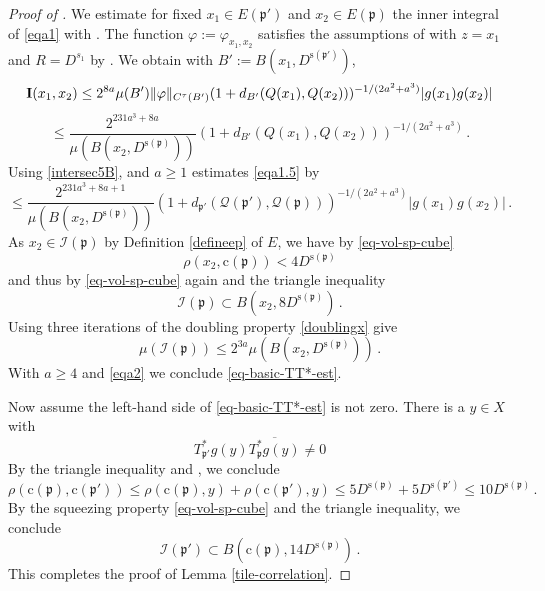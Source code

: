 \documentclass[10pt,a4paper]{article}
\theoremstyle{plain}
\theoremstyle{definition}
\numberwithin{equation}{subsection}
\newcommand{\fp}{{\mathfrak p}}
\newcommand{\pc}{{\mathrm{c}}}
\newcommand{\ps}{{\mathrm{s}}}
\newcommand{\scI}{{\mathcal{I}}} %
\newcommand{\tQ}{{Q}}
\newcommand{\fcc}{{\mathcal{Q}}}
\begin{document}
\begin{proof}[Proof of ]
We estimate for fixed $x_1\in E(\fp')$ and
$x_2\in E(\fp)$ the inner integral of \eqref{eqa1} with
. The function
$\varphi:=\varphi_{x_1,x_2}$ satisfies the assumptions of
 with $z = x_1$ and $R = D^{s_1}$ by .
We obtain with $B':= B(x_1, D^{\ps(\fp')})$,
\begin{equation*}
 {\bf I}(x_1, x_2) \le 2^{8a} \mu(B') \|{\varphi}\|_{C^\tau(B')}
       (1 + d_{B'}(\tQ(x_1),\tQ(x_2)))^{-1/(2a^2+a^3)}|g(x_1)g(x_2)|
\end{equation*}
\begin{equation}
\label{eqa1.5}
 \le \frac{2^{231a^3+8a}}
 {\mu(B(x_2, D^{\ps(\fp)}))}
       (1 + d_{B'}(\tQ(x_1),\tQ(x_2)))^{-1/(2a^2+a^3)}\,.
\end{equation}
Using \eqref{intersec5B},  and $a\ge 1$ estimates \eqref{eqa1.5} by
\begin{equation}\label{eqa2}
 \le \frac{2^{231a^3 + 8a + 1}}
 {\mu(B(x_2, D^{\ps(\fp)}))}
       (1+d_{\fp'}(\fcc(\fp'), \fcc(\fp)))^{-1/(2a^2+a^3)}|g(x_1)g(x_2)|\,.
\end{equation}
As $x_2\in \scI(\fp)$ by Definition \eqref{defineep} of $E$, we have by \eqref{eq-vol-sp-cube}
\begin{equation}
    \rho(x_2,\pc(\fp)) < 4D^{\ps(\fp)}
\end{equation}
and thus by \eqref{eq-vol-sp-cube} again and the triangle inequality
\begin{equation}
    \scI(\fp)\subset B(x_2,8D^{\ps(\fp)})\, .
\end{equation}
Using three iterations of the doubling property \eqref{doublingx} give
\begin{equation}
    \mu(\scI(\fp))\le 2^{3a}\mu(B(x_2,D^{\ps(\fp)}))\, .
\end{equation}
With $a\ge 4$ and \eqref{eqa2} we conclude \eqref{eq-basic-TT*-est}.


Now assume the left-hand side of \eqref{eq-basic-TT*-est} is not zero.
There is a $y\in X$ with
\begin{equation}
    T^*_{\fp'}g(y)\overline{T^*_{\fp}g(y)}\neq 0
\end{equation}
By the triangle inequality and , we conclude
\begin{equation}
   \rho(\pc(\fp),\pc(\fp'))\le \rho(\pc(\fp),y) +\rho(\pc(\fp'),y)
   \le 5D^{\ps(\fp)}+5D^{\ps(\fp')}\le 10 D^{\ps(\fp)}\, .
\end{equation}
By the squeezing property \eqref{eq-vol-sp-cube} and the triangle inequality,
we conclude
\begin{equation}
    \scI(\fp') \subset B(\pc(\fp), 14D^{\ps(\fp)})\, .
\end{equation}
   This completes the proof of Lemma \ref{tile-correlation}.
\end{proof}
\end{document}
